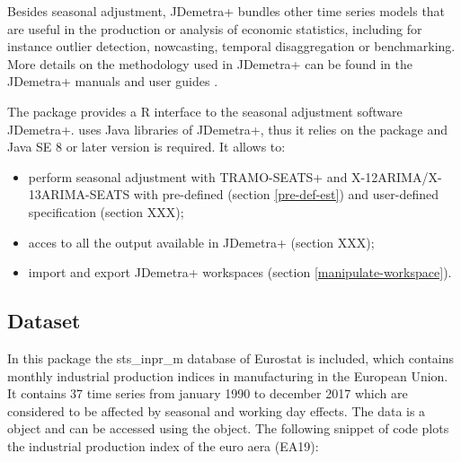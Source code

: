 \documentclass[article]{jss}
\providecommand{\tightlist}{%
  \setlength{\itemsep}{0pt}\setlength{\parskip}{0pt}}
\begin{document}
Besides seasonal adjustment, JDemetra+ bundles other time series models
that are useful in the production or analysis of economic statistics,
including for instance outlier detection, nowcasting, temporal
disaggregation or benchmarking. More details on the methodology used in
JDemetra+ can be found in the JDemetra+ manuals and user guides
\citep{grudkowska2015jdemetrarm, grudkowska2015jdemetraug}.

The package  provides a R interface to the seasonal
adjustment software JDemetra+.  uses Java libraries of
JDemetra+, thus it relies on the  \citep{rJava} package and
Java SE 8 or later version is required. It allows to:

\begin{itemize}
\tightlist
\item
  perform seasonal adjustment with TRAMO-SEATS+ and
  X-12ARIMA/X-13ARIMA-SEATS with pre-defined (section \ref{pre-def-est})
  and user-defined specification (section XXX);\\
\item
  acces to all the output available in JDemetra+ (section XXX);\\
\item
  import and export JDemetra+ workspaces (section
  \ref{manipulate-workspace}).
\end{itemize}

\hypertarget{dataset}{%
\subsection{Dataset}\label{dataset}}

In this package the sts\_inpr\_m database of Eurostat is included, which
contains monthly industrial production indices in manufacturing in the
European Union. It contains 37 time series from january 1990 to december
2017 which are considered to be affected by seasonal and working day
effects. The data is a  object and can be accessed using the
 object. The following snippet of code plots the
industrial production index of the euro aera (EA19):
\end{document}
